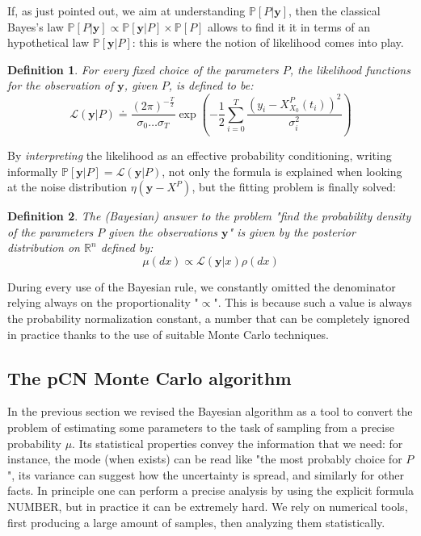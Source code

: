 \documentclass[8pt]{article}
\newtheorem{definition}{Definition}
\begin{document}
If, as just pointed out, we aim at understanding 
$\mathbb{P}[P | \textbf{y}]$, then the classical Bayes's law
$\mathbb{P}[P | \textbf{y}] \propto
	\mathbb{P}[\textbf{y} | P] \times \mathbb{P}[P]$
allows to find it 
it in terms of an hypothetical law $\mathbb{P}[\textbf{y} | P]$: this
is where the notion of likelihood comes into play.


\begin{definition}
For every fixed choice of the parameters $P$, the likelihood functions
for the observation of $\textbf{y}$, given $P$, is defined to be:
	\begin{equation}
	\mathcal{L}(\textbf{y}|P) \doteq 
		\frac{(2 \pi)^{- \frac{T}{2}}}
		{\sigma_0\dots\sigma_{T}}
		\exp \left( -\frac{1}{2} 
		\sum_{i=0}^{T} 
		\frac{(y_i - X_{X_0}^P(t_i))^2}
		{\sigma_i^2}
		\right )
	\end{equation}
\end{definition}


By \emph{interpreting} the likelihood as an effective probability
conditioning, writing informally 
$\mathbb{P}[\textbf{y}|P] = \mathcal{L}(\textbf{y}|P)$,
not only 
the formula is explained when looking at the noise
distribution $\eta(\textbf{y} - X^P)$, but the 
fitting problem is finally solved:

\begin{definition}
	The (Bayesian)
	answer to the problem "find the probability density of
	the parameters $P$ given the observations $\textbf{y}$"
	is given by the \emph{posterior}
	distribution on $\mathbb{R}^{n}$ defined by:
	\begin{equation}
		\mu(dx) \propto \mathcal{L}(\textbf{y} | x) \rho(dx)
	\end{equation}
\end{definition}


During every use of the Bayesian rule, we constantly omitted the denominator
relying always on the proportionality "$\propto$". 
This is because such a value is always the probability 
normalization constant,
a number that can be completely ignored in practice thanks to the use
of suitable Monte Carlo techniques.


\subsection{The pCN Monte Carlo algorithm}
In the previous section we revised the Bayesian algorithm
as a tool to convert the problem of
estimating some parameters to the task
of sampling from a precise probability $\mu$.
Its statistical properties convey the information that we need:
for instance, the mode (when exists) can be read like "the most probably
choice for $P$", its variance can suggest how the uncertainty
is spread, and similarly for other facts.
In principle one can perform a precise analysis
by using the explicit formula NUMBER, but in practice it can be
extremely hard. We rely on numerical tools, first
producing a large amount of samples, then analyzing them statistically.
\end{document}
